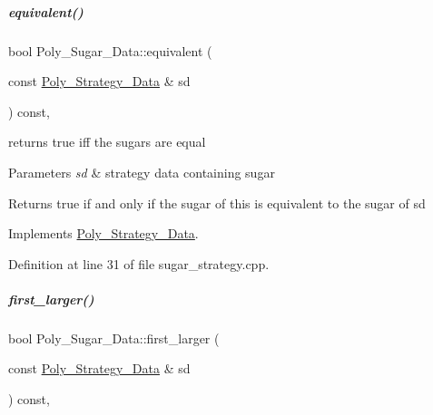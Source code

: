 \mbox{\label{group__strategygroup_afd535711760db4abd9851429184ac94c}} 
\subparagraph{\texorpdfstring{equivalent()}{equivalent()}}
{\footnotesize\ttfamily bool Poly\+\_\+\+Sugar\+\_\+\+Data\+::equivalent (\begin{DoxyParamCaption}\item[{const \hyperlink{group__strategygroup_class_poly___strategy___data}{Poly\+\_\+\+Strategy\+\_\+\+Data} \&}]{sd }\end{DoxyParamCaption}) const\hspace{0.3cm}{\ttfamily [override]}, {\ttfamily [virtual]}}



returns {\ttfamily true} iff the sugars are equal 


\begin{DoxyParams}{Parameters}
{\em sd} & strategy data containing sugar \\
\hline
\end{DoxyParams}
\begin{DoxyReturn}{Returns}
{\ttfamily true} if and only if the sugar of {\ttfamily this} is equivalent to the sugar of {\ttfamily sd} 
\end{DoxyReturn}


Implements \hyperlink{group__strategygroup_aa82a57a8bf9b3c14fd65a573fd78a4a5}{Poly\+\_\+\+Strategy\+\_\+\+Data}.



Definition at line 31 of file sugar\+\_\+strategy.\+cpp.

\mbox{\label{group__strategygroup_a3473aac2bafb690a52670aa226fb47b2}} 
\subparagraph{\texorpdfstring{first\+\_\+larger()}{first\_larger()}}
{\footnotesize\ttfamily bool Poly\+\_\+\+Sugar\+\_\+\+Data\+::first\+\_\+larger (\begin{DoxyParamCaption}\item[{const \hyperlink{group__strategygroup_class_poly___strategy___data}{Poly\+\_\+\+Strategy\+\_\+\+Data} \&}]{sd }\end{DoxyParamCaption}) const\hspace{0.3cm}{\ttfamily [override]}, {\ttfamily [virtual]}}



